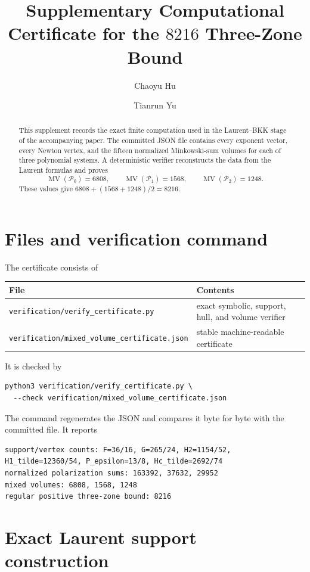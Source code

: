\documentclass[11pt]{article}
\title{Supplementary Computational Certificate for the $8216$ Three-Zone Bound}
\author{Chaoyu Hu \and Tianrun Yu}
\date{}
\newcommand{\MV}{\operatorname{MV}}
\begin{document}
\maketitle

\begin{abstract}
This supplement records the exact finite computation used in the Laurent--BKK stage of the accompanying paper.  The committed JSON file contains every exponent vector, every Newton vertex, and the fifteen normalized Minkowski-sum volumes for each of three polynomial systems.  A deterministic verifier reconstructs the data from the Laurent formulas and proves
\[
 \MV(\mathcal P_0)=6808,
 \qquad
 \MV(\mathcal P_1)=1568,
 \qquad
 \MV(\mathcal P_2)=1248.
\]
These values give $6808+(1568+1248)/2=8216$.
\end{abstract}

\section{Files and verification command}

The certificate consists of
\begin{center}
\begin{tabular}{@{}p{}p{}@{}}
\toprule
File & Contents\\
\midrule
\nolinkurl{verification/verify_certificate.py}
  & exact symbolic, support, hull, and volume verifier\\
\nolinkurl{verification/mixed_volume_certificate.json}
  & stable machine-readable certificate\\
\bottomrule
\end{tabular}
\end{center}
It is checked by
\begin{verbatim}
python3 verification/verify_certificate.py \
  --check verification/mixed_volume_certificate.json
\end{verbatim}
The command regenerates the JSON and compares it byte for byte with the committed file.  It reports
\begin{verbatim}
support/vertex counts: F=36/16, G=265/24, H2=1154/52,
H1_tilde=12360/54, P_epsilon=13/8, Hc_tilde=2692/74
normalized polarization sums: 163392, 37632, 29952
mixed volumes: 6808, 1568, 1248
regular positive three-zone bound: 8216
\end{verbatim}

\section{Exact Laurent support construction}
\end{document}
